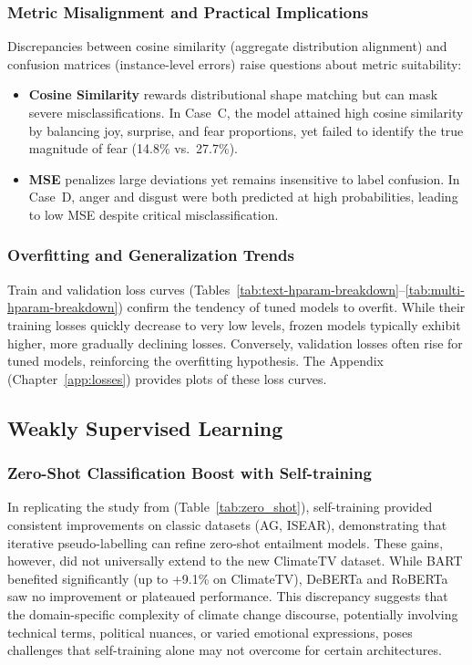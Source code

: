 \subsubsection*{Metric Misalignment and Practical Implications}
Discrepancies between cosine similarity (aggregate distribution alignment) and confusion matrices (instance-level errors) raise questions about metric suitability:
\begin{itemize}
    \item \textbf{Cosine Similarity} rewards distributional shape matching but can mask severe misclassifications. In Case~C, the model attained high cosine similarity by balancing joy, surprise, and fear proportions, yet failed to identify the true magnitude of fear (14.8\% vs.\ 27.7\%).
    \item \textbf{MSE} penalizes large deviations yet remains insensitive to label confusion. In Case~D, anger and disgust were both predicted at high probabilities, leading to low MSE despite critical misclassification.
\end{itemize}


\subsubsection*{Overfitting and Generalization Trends}
Train and validation loss curves (Tables~\ref{tab:text-hparam-breakdown}--\ref{tab:multi-hparam-breakdown}) confirm the tendency of tuned models to overfit. While their training losses quickly decrease to very low levels, frozen models typically exhibit higher, more gradually declining losses. Conversely, validation losses often rise for tuned models, reinforcing the overfitting hypothesis. The Appendix (Chapter~\ref{app:losses}) provides plots of these loss curves.
\newline


\subsection{Weakly Supervised Learning}
\subsubsection*{Zero-Shot Classification Boost with Self-training}
In replicating the study from \citet{gera_zero-shot_2022} (Table \ref{tab:zero_shot}), self-training provided consistent improvements on classic datasets (AG, ISEAR), demonstrating that iterative pseudo-labelling can refine zero-shot entailment models. These gains, however, did not universally extend to the new ClimateTV dataset. While BART benefited significantly (up to +9.1\% on ClimateTV), DeBERTa and RoBERTa saw no improvement or plateaued performance. This discrepancy suggests that the domain-specific complexity of climate change discourse, potentially involving technical terms, political nuances, or varied emotional expressions, poses challenges that self-training alone may not overcome for certain architectures.

